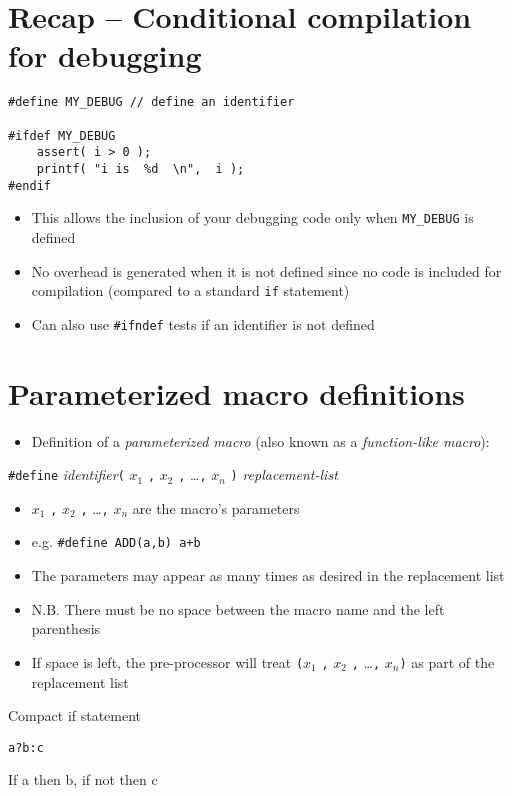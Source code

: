 \documentclass{article}
\begin{document}
\section{Recap -- Conditional compilation for debugging}
\begin{verbatim}
#define MY_DEBUG // define an identifier

#ifdef MY_DEBUG
	assert( i > 0 );
	printf( "i is  %d  \n",  i );
#endif
\end{verbatim}

\begin{itemize}
\item This allows the inclusion of your debugging code only when \verb!MY_DEBUG! is defined
\item No overhead is generated when it is not defined since no code is included for compilation (compared to a standard \verb!if! statement)
\item Can also use \verb!#ifndef! tests if an identifier is not defined
\end{itemize}




\section{Parameterized macro definitions}
\begin{itemize}
\item Definition of a \emph{parameterized macro} (also known as a \emph{function-like macro}):
\end{itemize}
\verb!#define! \emph{identifier}\verb!(! $x_1$ \verb!,! $x_2$ \verb!,! \ldots \verb!,! $x_n$ \verb!)! \emph{replacement-list}
\begin{itemize}
\item $x_1$ \verb!,! $x_2$ \verb!,! \ldots \verb!,! $x_n$ are the macro's parameters
\item e.g. \texttt{#define ADD(a,b) a+b}
\item The parameters may appear as many times as desired in the replacement list
\item N.B. There must be no space between the macro name and the left parenthesis
\item If space is left, the pre-processor will treat \verb!(!$x_1$ \verb!,! $x_2$ \verb!,! \ldots \verb!,! $x_n$\verb!)!  as part of the replacement list
\end{itemize}


Compact if statement
\begin{verbatim}
a?b:c
\end{verbatim}
If a then b, if not then c
\end{document}
